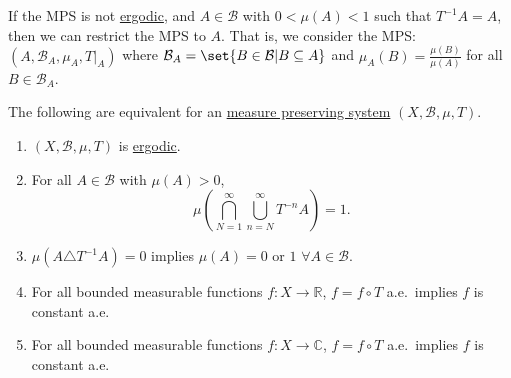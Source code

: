 \documentclass{article}
\begin{document}
If the MPS is not \hyperlink{def:ergodic}{ergodic}, and $A \in \mathcal{B}$ with $0 < \mu(A) < 1$ such that $T^{-1} A = A$, then we can restrict the MPS to $A$.
That is, we consider the MPS: $(A, \mathcal{B}_A, \mu_A, T|_A)$ where $\mathcal{B}_A = \set{B \in \mathcal{B} | B \subseteq A}$ and $\mu_A(B) = \frac{\mu(B)}{\mu(A)}$ for all $B \in \mathcal{B}_A$.
\begin{thm}
  The following are equivalent for an \hyperlink{def:mps}{measure preserving system} $(X, \mathcal{B}, \mu,T)$.
  \begin{enumerate}[label=(\arabic*)]
    \item $(X, \mathcal{B}, \mu, T)$ is \hyperlink{def:ergodic}{ergodic}.
    \item For all $A \in \mathcal{B}$ with $\mu(A) > 0$,
      \begin{equation*}
        \mu\left(\bigcap_{N=1}^\infty \bigcup_{n=N}^\infty T^{-n} A\right) = 1.
      \end{equation*}
    \item $\mu(A \triangle T^{-1} A) = 0$ implies $\mu(A) = 0$ or $1$ $\forall A \in \mathcal{B}$.
    \item For all bounded measurable functions $f: X \to \mathbb{R}$,
      $f = f \circ T$ a.e.\ implies $f$ is constant a.e.
    \item For all bounded measurable functions $f: X \to \mathbb{C}$,
      $f = f \circ T$ a.e.\ implies $f$ is constant a.e.
  \end{enumerate}
\end{thm}
\end{document}
